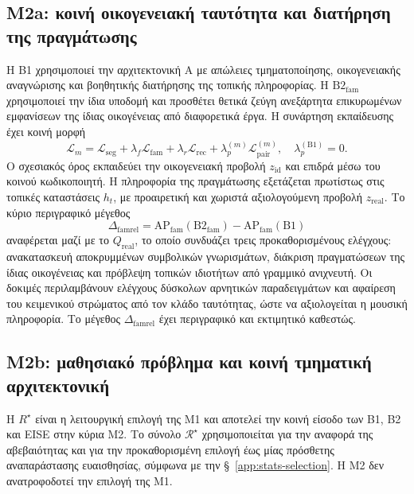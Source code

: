 \documentclass[11pt,a4paper]{article}
\begin{document}
\subsection{Μ2a: κοινή οικογενειακή ταυτότητα και διατήρηση της πραγμάτωσης}\label{sec:m2a}

Η B1 χρησιμοποιεί την αρχιτεκτονική A με απώλειες τμηματοποίησης, οικογενειακής αναγνώρισης και βοηθητικής διατήρησης της τοπικής πληροφορίας. Η $\mathrm{B2}_{\mathrm{fam}}$ χρησιμοποιεί την ίδια υποδομή και προσθέτει θετικά ζεύγη ανεξάρτητα επικυρωμένων εμφανίσεων της ίδιας οικογένειας από διαφορετικά έργα. Η συνάρτηση εκπαίδευσης έχει κοινή μορφή
\[
\mathcal L_m=\mathcal L_{\mathrm{seg}}+\lambda_f\mathcal L_{\mathrm{fam}}+\lambda_r\mathcal L_{\mathrm{rec}}+\lambda_p^{(m)}\mathcal L_{\mathrm{pair}}^{(m)},\quad
\lambda_p^{(\mathrm{B1})}=0.
\]
Ο σχεσιακός όρος εκπαιδεύει την οικογενειακή προβολή $z_{\mathrm{id}}$ και επιδρά μέσω του κοινού κωδικοποιητή. Η πληροφορία της πραγμάτωσης εξετάζεται πρωτίστως στις τοπικές καταστάσεις $h_t$, με προαιρετική και χωριστά αξιολογούμενη προβολή $z_{\mathrm{real}}$. Το κύριο περιγραφικό μέγεθος
\[
\Delta_{\mathrm{famrel}}=\mathrm{AP}_{\mathrm{fam}}(\mathrm{B2}_{\mathrm{fam}})-\mathrm{AP}_{\mathrm{fam}}(\mathrm{B1})
\]
αναφέρεται μαζί με το $Q_{\mathrm{real}}$, το οποίο συνδυάζει τρεις προκαθορισμένους ελέγχους: ανακατασκευή αποκρυμμένων συμβολικών γνωρισμάτων, διάκριση πραγματώσεων της ίδιας οικογένειας και πρόβλεψη τοπικών ιδιοτήτων από γραμμικό ανιχνευτή. Οι δοκιμές περιλαμβάνουν ελέγχους δύσκολων αρνητικών παραδειγμάτων και αφαίρεση του κειμενικού στρώματος από τον κλάδο ταυτότητας, ώστε να αξιολογείται η μουσική πληροφορία. Το μέγεθος $\Delta_{\mathrm{famrel}}$ έχει περιγραφικό και εκτιμητικό καθεστώς.

\subsection{Μ2b: μαθησιακό πρόβλημα και κοινή τμηματική αρχιτεκτονική}\label{sec:m2b}


Η $R^\star$ είναι η λειτουργική επιλογή της M1 και αποτελεί την κοινή είσοδο των B1, B2 και EISE στην κύρια M2. Το σύνολο $\mathcal R^\star$ χρησιμοποιείται για την αναφορά της αβεβαιότητας και για την προκαθορισμένη επιλογή έως μίας πρόσθετης αναπαράστασης ευαισθησίας, σύμφωνα με την §~\ref{app:stats-selection}. Η M2 δεν ανατροφοδοτεί την επιλογή της M1.
\end{document}
